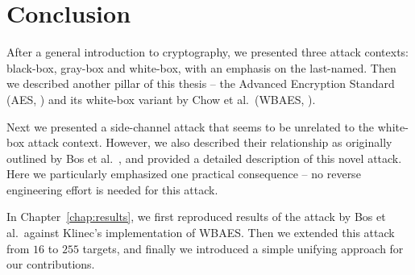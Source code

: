 \cleardoublepage{}

\chapter*{Conclusion}
\label{chap:concl}

After a general introduction to cryptography, we presented three attack contexts: black-box, gray-box and white-box, with an emphasis on the last-named. Then we described another pillar of this thesis -- the Advanced Encryption Standard (AES, \cite{fips2001aes}) and its white-box variant by Chow et al.\ (WBAES, \cite{chow2002aes}).

Next we presented a side-channel attack that seems to be unrelated to the white-box attack context. However, we also described their relationship as originally outlined by Bos et al.\ \cite{bos2015differential}, and provided a detailed description of this novel attack. Here we particularly emphasized one practical consequence -- no reverse engineering effort is needed for this attack.

In Chapter~\ref{chap:results}, we first reproduced results of the attack by Bos et al.\ against Klinec's implementation \cite{klinec2013implementation} of WBAES. Then we extended this attack from $16$ to $255$ targets, and finally we introduced a simple unifying approach for our contributions.

